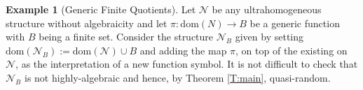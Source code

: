 \documentclass[11pt]{amsart}
\theoremstyle{plain}
\theoremstyle{definition}
\newtheorem{example}[theorem]{Example}
\begin{document}
\begin{example}[Generic Finite Quotients]
Let $\mathcal{N}$ be any ultrahomogeneous structure without algebraicity and let $\pi\colon \mathrm{dom}(N)\to B$ be a generic function with $B$ being a  finite set. Consider the structure $\mathcal{N}_{B}$ given by setting   $\mathrm{dom}(\mathcal{N}_{B}):=\mathrm{dom}(\mathcal{N})\cup B$ and adding  the map $\pi$, on top of the existing on $\mathcal{N}$,  as the interpretation of a new function symbol. It is not difficult to check that  $\mathcal{N}_B$ is not highly-algebraic and hence, by Theorem \ref{T:main}, quasi-random. 
\end{example}
\end{document}
